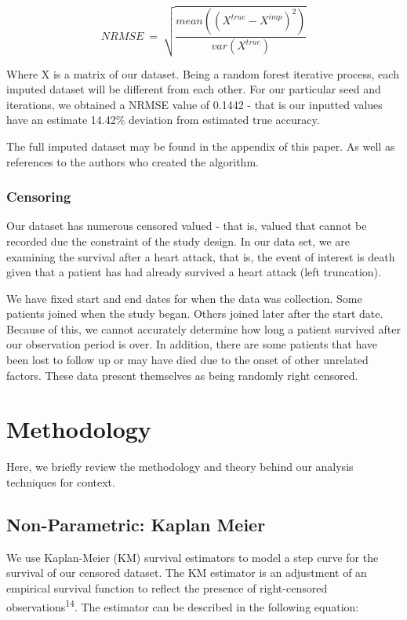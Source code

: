 \documentclass[
]{article}
\begin{document}
\[ NRMSE\ =\ \sqrt{\frac{mean\left(\left(X^{true}-X^{imp}\right)^2\right)}{var\left(X^{true}\right)}} \]

Where X is a matrix of our dataset. Being a random forest iterative
process, each imputed dataset will be different from each other. For our
particular seed and iterations, we obtained a NRMSE value of 0.1442 -
that is our inputted values have an estimate 14.42\% deviation from
estimated true accuracy.

The full imputed dataset may be found in the appendix of this paper. As
well as references to the authors who created the algorithm.

\hypertarget{censoring}{%
\subsubsection{Censoring}\label{censoring}}

Our dataset has numerous censored valued - that is, valued that cannot
be recorded due the constraint of the study design. In our data set, we
are examining the survival after a heart attack, that is, the event of
interest is death given that a patient has had already survived a heart
attack (left truncation).

We have fixed start and end dates for when the data was collection. Some
patients joined when the study began. Others joined later after the
start date. Because of this, we cannot accurately determine how long a
patient survived after our observation period is over. In addition,
there are some patients that have been lost to follow up or may have
died due to the onset of other unrelated factors. These data present
themselves as being randomly right censored.

\hypertarget{methodology}{%
\section{Methodology}\label{methodology}}

Here, we briefly review the methodology and theory behind our analysis
techniques for context.

\hypertarget{non-parametric-kaplan-meier}{%
\subsection{Non-Parametric: Kaplan
Meier}\label{non-parametric-kaplan-meier}}

We use Kaplan-Meier (KM) survival estimators to model a step curve for
the survival of our censored dataset. The KM estimator is an adjustment
of an empirical survival function to reflect the presence of
right-censored observations\textsuperscript{14}. The estimator can be
described in the following equation:
\end{document}
